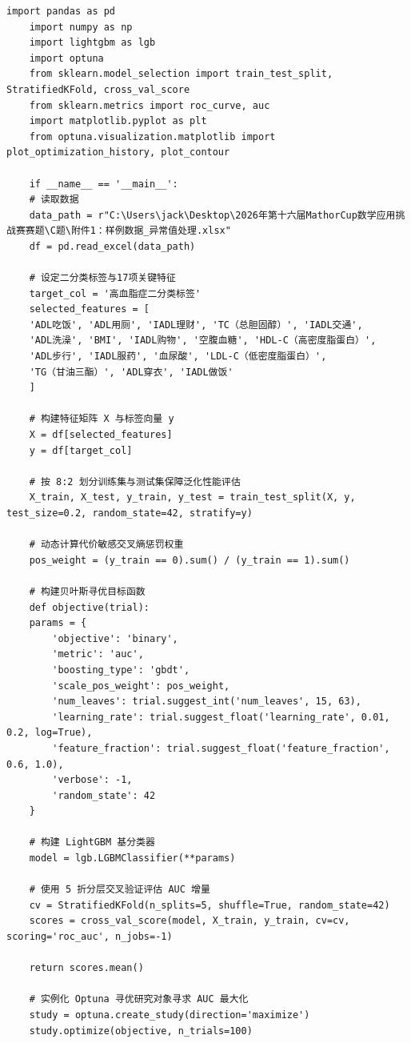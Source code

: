 \documentclass[12pt]{article}
\begin{document}
\begin{lstlisting}[caption={LightGBM-Optuna贝叶斯优化高血脂症诊断模型}, label={code:lgb_optuna_hyperlipidemia}]
	import pandas as pd
	import numpy as np
	import lightgbm as lgb
	import optuna
	from sklearn.model_selection import train_test_split, StratifiedKFold, cross_val_score
	from sklearn.metrics import roc_curve, auc
	import matplotlib.pyplot as plt
	from optuna.visualization.matplotlib import plot_optimization_history, plot_contour
	
	if __name__ == '__main__':
	# 读取数据
	data_path = r"C:\Users\jack\Desktop\2026年第十六届MathorCup数学应用挑战赛赛题\C题\附件1：样例数据_异常值处理.xlsx"
	df = pd.read_excel(data_path)
	
	# 设定二分类标签与17项关键特征
	target_col = '高血脂症二分类标签'
	selected_features = [
	'ADL吃饭', 'ADL用厕', 'IADL理财', 'TC（总胆固醇）', 'IADL交通',
	'ADL洗澡', 'BMI', 'IADL购物', '空腹血糖', 'HDL-C（高密度脂蛋白）',
	'ADL步行', 'IADL服药', '血尿酸', 'LDL-C（低密度脂蛋白）',
	'TG（甘油三酯）', 'ADL穿衣', 'IADL做饭'
	]
	
	# 构建特征矩阵 X 与标签向量 y
	X = df[selected_features]
	y = df[target_col]
	
	# 按 8:2 划分训练集与测试集保障泛化性能评估
	X_train, X_test, y_train, y_test = train_test_split(X, y, test_size=0.2, random_state=42, stratify=y)
	
	# 动态计算代价敏感交叉熵惩罚权重
	pos_weight = (y_train == 0).sum() / (y_train == 1).sum()
	
	# 构建贝叶斯寻优目标函数
	def objective(trial):
	params = {
		'objective': 'binary',
		'metric': 'auc',
		'boosting_type': 'gbdt',
		'scale_pos_weight': pos_weight,
		'num_leaves': trial.suggest_int('num_leaves', 15, 63),
		'learning_rate': trial.suggest_float('learning_rate', 0.01, 0.2, log=True),
		'feature_fraction': trial.suggest_float('feature_fraction', 0.6, 1.0),
		'verbose': -1,
		'random_state': 42
	}
	
	# 构建 LightGBM 基分类器
	model = lgb.LGBMClassifier(**params)
	
	# 使用 5 折分层交叉验证评估 AUC 增量
	cv = StratifiedKFold(n_splits=5, shuffle=True, random_state=42)
	scores = cross_val_score(model, X_train, y_train, cv=cv, scoring='roc_auc', n_jobs=-1)
	
	return scores.mean()
	
	# 实例化 Optuna 寻优研究对象寻求 AUC 最大化
	study = optuna.create_study(direction='maximize')
	study.optimize(objective, n_trials=100)
	

\end{lstlisting}
\end{document}
